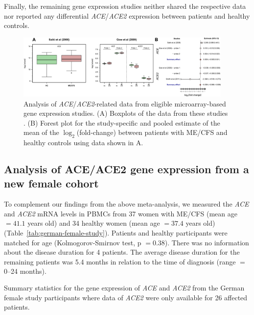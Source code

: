 Finally, the remaining gene expression studies neither shared the respective data nor reported any differential \textit{ACE}/\textit{ACE2} expression between patients and healthy controls.

\begin{figure}
    \centering
    \includegraphics[width=0.95\textwidth]{chapter/2021-ace-ace2/figures/fig3-ace-ace2-microarrays.jpg}
    \caption[Analysis of \textit{ACE}/\textit{ACE2}-related data from eligible microarray-based gene expression studies]{Analysis of \textit{ACE}/\textit{ACE2}-related data from eligible microarray-based gene expression studies. (A) Boxplots of the data from these studies \citep{saikiIdentificationMarkerGenes2008, gowGeneSignaturePostinfectious2009}. (B) Forest plot for the study-specific and pooled estimate of the mean of the {$\log_{2}$}(fold-change) between patients with ME/CFS and healthy controls using data shown in A.}
    \label{fig:ace-ace2-microarrays}
\end{figure}

\subsection{Analysis of ACE/ACE2 gene expression from a new female cohort}

To complement our findings from the above meta-analysis, we measured the \textit{ACE} and \textit{ACE2} mRNA levels in PBMCs from 37 women with ME/CFS (mean age $= 41.1$ years old) and 34 healthy women (mean age $= 37.4$ years old) (Table~\ref{tab:german-female-study}). Patients and healthy participants were matched for age (Kolmogorov-Smirnov test, p $= 0.38$). There was no information about the disease duration for 4 patients. The average disease duration for the remaining patients was 5.4 months in relation to the time of diagnosis (range $=$ 0--24 months).

\begin{table}[h]
    \centering
    \caption[Summary statistics for the gene expression of \textit{ACE} and \textit{ACE2} from the German female study participants]{Summary statistics for the gene expression of \textit{ACE} and \textit{ACE2} from the German female study participants where data of \textit{ACE2} were only available for 26 affected patients.}
    
    \label{tab:german-female-study}
\end{table}

